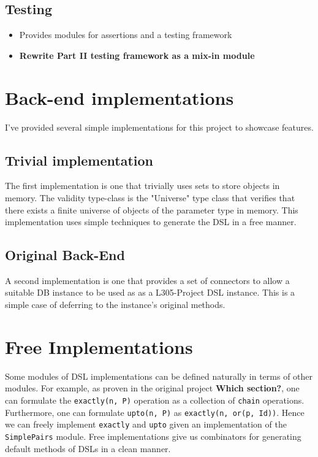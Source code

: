 \documentclass{report}
\newcommand \2[0]{\textbf{2}}
\newcommand \3[0]{\textbf{3}}
\newcommand{\todo}[1]{\textbf{#1}}
\begin{document}
\section{Testing}
\begin{itemize}
    \item Provides modules for assertions and a testing framework
    \item \todo{Rewrite Part II testing framework as a mix-in module}
\end{itemize}

\chapter{Back-end implementations}

I've provided several simple implementations for this project to showcase features.
\section{Trivial implementation}
The first implementation is one that trivially uses sets  to store objects in memory. The validity type-class is the "Universe" type class that verifies that there exists a finite universe of objects of the parameter type in memory. This implementation uses simple techniques to generate the DSL in a free manner.

\section{Original Back-End}
A second implementation is one that provides a set of connectors to allow a suitable DB instance to be used as as a L305-Project DSL instance. This is a simple case of deferring to the instance's original methods.


\chapter{Free Implementations}
Some modules of DSL implementations can be defined naturally in terms of other modules. For example, as proven in the original project \todo{Which section?}, one can formulate the \texttt{exactly(n, P)} operation as a collection of \texttt{chain} operations. Furthermore, one can formulate \texttt{upto(n, P)} as \texttt{exactly(n, or(p, Id))}. Hence we can freely implement \texttt{exactly} and \texttt{upto} given an implementation of the \texttt{SimplePairs} module. Free implementations give us combinators for generating default methods of DSLs in a clean manner.
\end{document}
